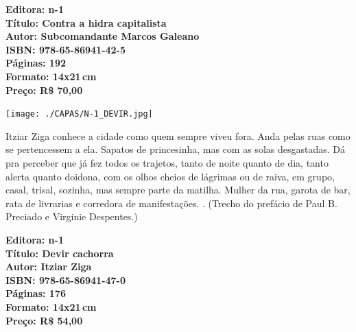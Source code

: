\vfill

\hspace*{-.4cm}\begin{minipage}[c]{.5\linewidth}
\small\textbf{
\hspace*{-.1cm}Editora: n-1\\
Título: Contra a hidra capitalista\\
Autor: Subcomandante Marcos Galeano\\ 
ISBN: 978-65-86941-42-5\\
Páginas: 192\\
Formato: 14x21\,cm\\
Preço: R\$ 70,00\\
}
\end{minipage}

\pagebreak

\begin{center}
\hspace*{.5cm}\texttt{[image: ./CAPAS/N-1\_DEVIR.jpg]}
\end{center}

\hspace*{-7cm}\hrulefill\hspace*{-7cm}

\medskip

\noindent{}Itziar Ziga conhece a cidade como quem sempre viveu fora. Anda pelas ruas como se pertencessem a ela. Sapatos de princesinha, mas com as solas desgastadas. Dá pra perceber que já fez todos os trajetos, tanto de noite quanto de dia, tanto alerta quanto doidona, com os olhos cheios de lágrimas ou de raiva, em grupo, casal, trisal, sozinha, mas sempre parte da matilha. Mulher da rua, garota de bar, rata de livrarias e corredora de manifestações. . (Trecho do prefácio de Paul B. Preciado e Virginie Despentes.)

\vfill

\hspace*{-.4cm}\begin{minipage}[c]{.5\linewidth}
\small\textbf{
\hspace*{-.1cm}Editora: n-1\\
Título: Devir cachorra\\
Autor: Itziar Ziga\\
ISBN: 978-65-86941-47-0\\
Páginas: 176\\
Formato: 14x21\,cm\\
Preço: R\$ 54,00\\
}
\end{minipage}

